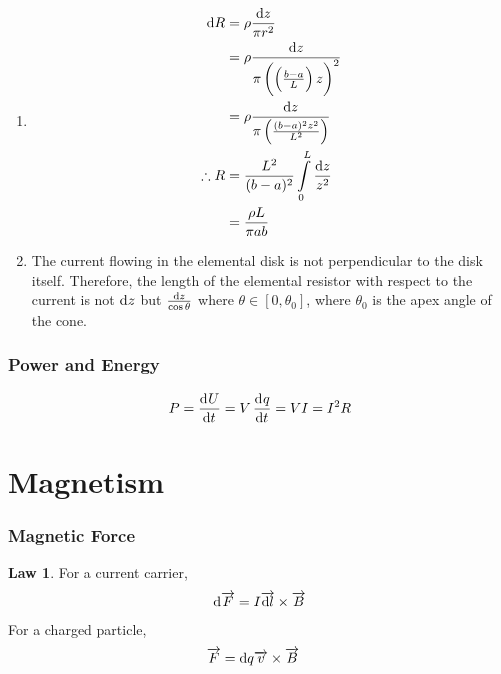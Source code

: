 \documentclass[fleqn, a4paper, 8pt, twoside]{amsart}
\theoremstyle{definition}
\theoremstyle{theorem}
\newtheorem{law}{Law}
\begin{document}
\begin{multicols}{2}
\begin{spacing}{0.6}
\begin{solution}
	\begin{enumerate}[leftmargin = *]
		\item
			\begin{align*}
				\dif R       & = \rho \frac{\dif z}{\pi r^2}                                              \\
                                             & = \rho \frac{\dif z}{\pi \left( \left( \frac{b - a}{L} \right)z \right)^2} \\
                                             & = \rho \frac{\dif z}{\pi \left( \frac{(b - a)^2 z^2}{L^2} \right)}         \\
				\therefore R & = \frac{L^2}{(b - a)^2}\int\limits_{0}^{L} \frac{\dif z}{z^2}              \\
                                             & = \frac{\rho L}{\pi a b}
			\end{align*}
		\item
			The current flowing in the elemental disk is not perpendicular to the disk itself.
			Therefore, the length of the elemental resistor with respect to the current is not $\dif z$ but $\frac{\dif z}{\cos \theta}$ where $\theta \in [0, \theta_0]$, where $\theta_0$ is the apex angle of the cone.
	\end{enumerate}
\end{solution}

\section{Power and Energy}

\begin{align*}
	P = \dod{U}{t} = V \dod{q}{t} = V I = I^2 R
\end{align*}

\part{Magnetism}

\section{Magnetic Force}

\begin{law}
	For a current carrier,
	\begin{align*}
		\dif \overrightarrow{F} & = I \overrightarrow{\dif l} \times \overrightarrow{B} \\
	\end{align*}
	For a charged particle,
	\begin{align*}
		\overrightarrow{F} & = \dif q \overrightarrow{v} \times \overrightarrow{B}
	\end{align*}
\end{law}


\end{spacing}
\end{multicols}
\end{document}
